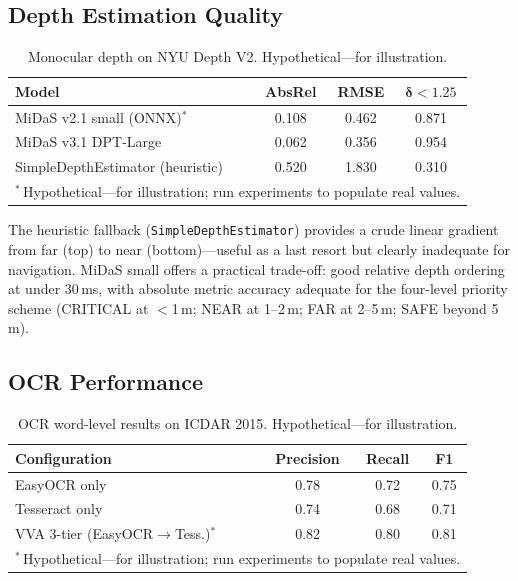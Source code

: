 \subsection{Depth Estimation Quality}

\begin{table}[ht]
\centering
\caption{Monocular depth on NYU Depth V2. \textnormal{Hypothetical---for illustration.}}
\label{tab:depth}
\begin{tabular}{lccc}
\hline
\textbf{Model} & \textbf{AbsRel} & \textbf{RMSE} & $\boldsymbol{\delta < 1.25}$ \\
\hline
MiDaS v2.1 small (ONNX)$^{*}$ & 0.108 & 0.462 & 0.871 \\
MiDaS v3.1 DPT-Large & 0.062 & 0.356 & 0.954 \\
SimpleDepthEstimator (heuristic) & 0.520 & 1.830 & 0.310 \\
\hline
\multicolumn{4}{l}{\footnotesize$^{*}$\,Hypothetical---for illustration; run experiments to populate real values.} \\
\end{tabular}
\end{table}

The heuristic fallback (\texttt{SimpleDepthEstimator}) provides a crude linear gradient from far (top) to near (bottom)---useful as a last resort but clearly inadequate for navigation. MiDaS small offers a practical trade-off: good relative depth ordering at under 30\,ms, with absolute metric accuracy adequate for the four-level priority scheme (CRITICAL at $<$1\,m; NEAR at 1--2\,m; FAR at 2--5\,m; SAFE beyond 5\,m).

\subsection{OCR Performance}

\begin{table}[ht]
\centering
\caption{OCR word-level results on ICDAR 2015. \textnormal{Hypothetical---for illustration.}}
\label{tab:ocr}
\begin{tabular}{lccc}
\hline
\textbf{Configuration} & \textbf{Precision} & \textbf{Recall} & \textbf{F1} \\
\hline
EasyOCR only & 0.78 & 0.72 & 0.75 \\
Tesseract only & 0.74 & 0.68 & 0.71 \\
VVA 3-tier (EasyOCR$\to$Tess.)$^{*}$ & 0.82 & 0.80 & 0.81 \\
\hline
\multicolumn{4}{l}{\footnotesize$^{*}$\,Hypothetical---for illustration; run experiments to populate real values.} \\
\end{tabular}
\end{table}

